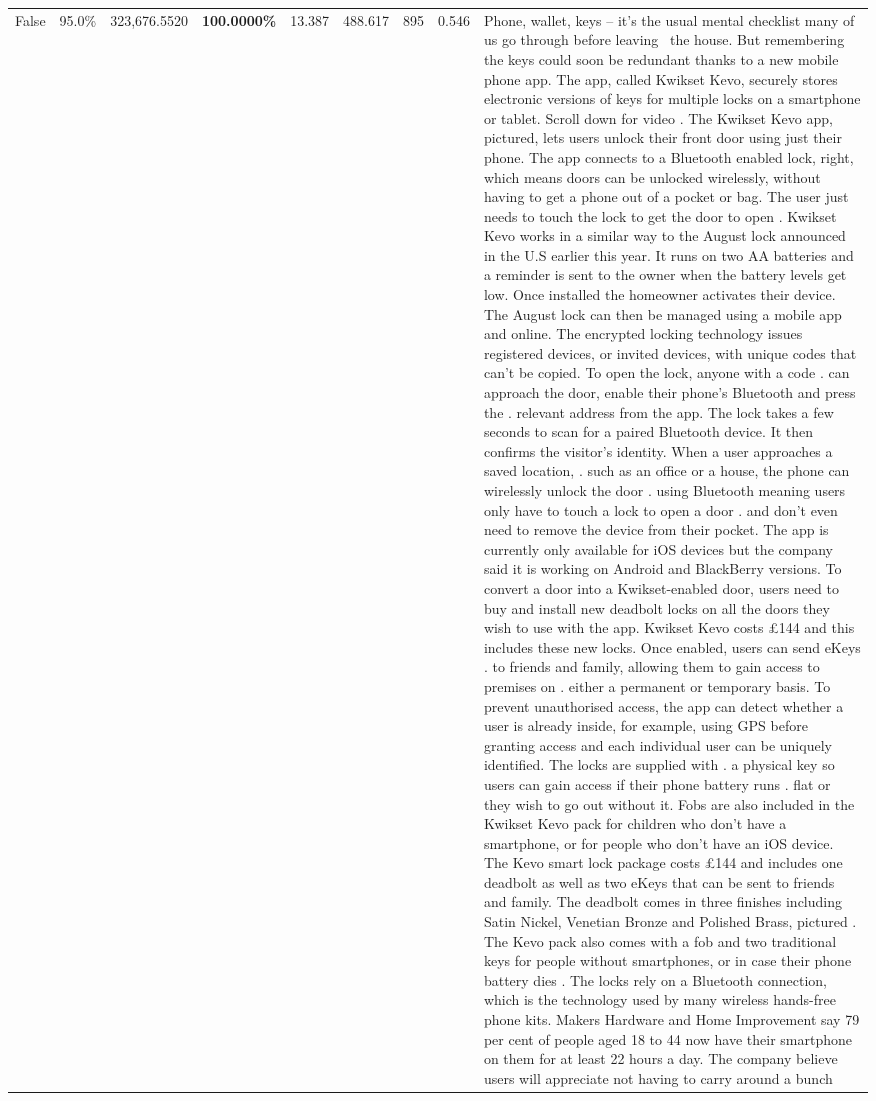 \begin{table}[H]
\begin{tabular}{lllrlllll}
False & 95.0\% & 323,676.5520 & \bfseries \color{red} 100.0000\% & 13.387 & 488.617 & 895 & 0.546 & Phone, wallet, keys – it’s the usual mental checklist many of us go through before leaving  the house. But remembering the keys could soon be redundant thanks to a new mobile phone app. The app, called Kwikset Kevo, securely stores electronic versions of keys for multiple locks on a smartphone or tablet. Scroll down for video . The Kwikset Kevo app, pictured, lets users unlock their front door using just their phone. The app connects to a Bluetooth enabled lock, right, which means doors can be unlocked wirelessly, without having to get a phone out of a pocket or bag. The user just needs to touch the lock to get the door to open . Kwikset Kevo works in a similar way to the August lock announced in the U.S earlier this year. It runs on two AA batteries and a reminder is sent to the owner when the battery levels get low. Once installed the homeowner activates their device. The August lock can then be managed using a mobile app and online. The encrypted locking technology issues registered devices, or invited devices, with unique codes that can't be copied. To open the lock, anyone with a code . can approach the door, enable their phone's Bluetooth and press the . relevant address from the app. The lock takes a few seconds to scan for a paired Bluetooth device. It then confirms the visitor's identity. When a user approaches a saved location, . such as an office or a house, the phone can wirelessly unlock the door . using Bluetooth meaning users only have to touch a lock to open a door . and don't even need to remove the device from their pocket. The app is currently only available for iOS devices but the company said it is working on Android and BlackBerry versions. To convert a door into a Kwikset-enabled door, users need to buy and install new deadbolt locks on all the doors they wish to use with the app. Kwikset Kevo costs £144 and this includes these new locks. Once enabled, users can send eKeys . to friends and family, allowing them to gain access to premises on . either a permanent or temporary basis. To prevent unauthorised access, the app can detect whether a user is already inside, for example, using GPS before granting access and each individual user can be uniquely identified. The locks are supplied with . a physical key so users can gain access if their phone battery runs . flat or they wish to go out without it. Fobs are also included in the Kwikset Kevo pack for children who don't have a smartphone, or for people who don't have an iOS device. The Kevo smart lock package costs £144 and includes one deadbolt as well as two eKeys that can be sent to friends and family. The deadbolt comes in three finishes including Satin Nickel, Venetian Bronze and Polished Brass, pictured . The Kevo pack also comes with a fob and two traditional keys for people without smartphones, or in case their phone battery dies . The locks rely on a Bluetooth connection, which is the technology used by many wireless hands-free phone kits. Makers Hardware and Home Improvement say 79 per cent of people aged 18 to 44 now have their smartphone on them for at least 22 hours a day. The company believe users will appreciate not having to carry around a bunch 
\end{tabular}
\end{table}
